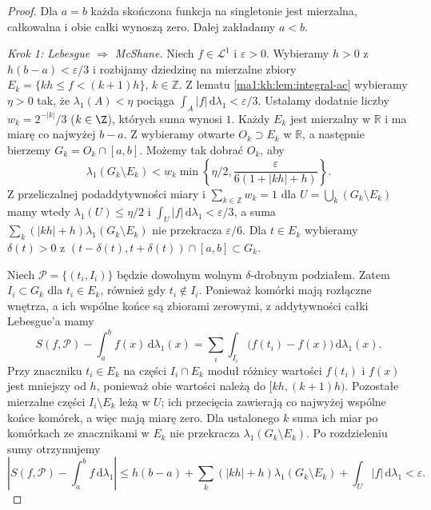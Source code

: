 \begin{proof}
Dla $a=b$ każda skończona funkcja na singletonie
jest mierzalna, całkowalna i obie całki wynoszą zero.
Dalej zakładamy $a<b$.

\emph{Krok 1: Lebesgue $\Rightarrow$ McShane.} Niech $f\in\mathcal L^1$ i $\varepsilon>0$. Wybieramy $h>0$ z $h(b-a)<\varepsilon/3$ i rozbijamy dziedzinę na mierzalne zbiory $E_k=\{kh\le f<(k+1)h\}$, $k\in\mathbb Z$. Z lematu \ref{ma1:kh:lem:integral-ac} wybieramy $\eta>0$ tak, że $\lambda_1(A)<\eta$ pociąga $\int_A|f|\,\mathrm d\lambda_1<\varepsilon/3$. Ustalamy dodatnie liczby $w_k=2^{-|k|}/3$ ($k\in\Z$), których suma wynosi $1$. Każdy $E_k$ jest mierzalny w $\mathbb R$ i ma miarę co najwyżej $b-a$. Z  wybieramy otwarte $O_k\supset E_k$ w $\mathbb R$, a następnie bierzemy $G_k=O_k\cap[a,b]$. Możemy tak dobrać $O_k$, aby
\[
 \lambda_1(G_k\setminus E_k)<
 w_k\min\left\{\eta/2,\frac{\varepsilon}{6(1+|kh|+h)}\right\}.
\]
Z przeliczalnej podaddytywności miary i $\sum_{k\in\mathbb Z}w_k=1$ dla $U=\bigcup_k(G_k\setminus E_k)$ mamy wtedy $\lambda_1(U)\le\eta/2$ i $\int_U|f|\,\mathrm d\lambda_1<\varepsilon/3$, a suma $\sum_k(|kh|+h)\lambda_1(G_k\setminus E_k)$ nie przekracza $\varepsilon/6$. Dla $t\in E_k$ wybieramy $\delta(t)>0$ z $(t-\delta(t),t+\delta(t))\cap[a,b]\subset G_k$.

Niech $\mathcal P=\{(t_i,I_i)\}$ będzie dowolnym wolnym $\delta$-drobnym podziałem. Zatem $I_i\subset G_k$ dla $t_i\in E_k$, również gdy $t_i\notin I_i$. Ponieważ komórki mają rozłączne wnętrza, a ich wspólne końce są zbiorami zerowymi, z addytywności całki Lebesgue'a mamy
\[
 S(f,\mathcal P)-\int_a^b f(x)\,\mathrm d\lambda_1(x)
 =\sum_i\int_{I_i}\bigl(f(t_i)-f(x)\bigr)\,\mathrm d\lambda_1(x).
\]
Przy znaczniku $t_i\in E_k$ na części $I_i\cap E_k$ moduł różnicy wartości $f(t_i)$ i $f(x)$ jest mniejszy od $h$, ponieważ obie wartości należą do $[kh,(k+1)h)$. Pozostałe mierzalne części $I_i\setminus E_k$ leżą w $U$; ich przecięcia zawierają co najwyżej wspólne końce komórek, a więc mają miarę zero. Dla ustalonego $k$ suma ich miar po komórkach ze znacznikami w $E_k$ nie przekracza $\lambda_1(G_k\setminus E_k)$. Po rozdzieleniu sumy otrzymujemy
\[
\left|S(f,\mathcal P)-\int_a^b f\,\mathrm d\lambda_1\right|
\le h(b-a)+\sum_k(|kh|+h)\lambda_1(G_k\setminus E_k)+\int_U|f|\,\mathrm d\lambda_1<\varepsilon.
\]


\end{proof}
